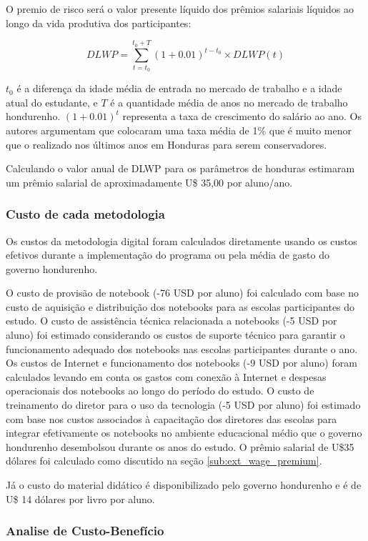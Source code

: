 \documentclass[12pt,letterpaper]{article}
\newcommand{\1}{\mathbbm{1}}
\numberwithin{equation}{section}
\begin{document}
O premio de risco será o valor presente líquido dos prêmios salariais líquidos ao longo da vida produtiva dos participantes:

\[DLWP = \sum_{t=t_0}^{t_0 + T} (1+0.01)^{t-t_0} \times DLWP(t)\]

\noindent \(t_0\) é a diferença da idade média de entrada no mercado de trabalho e a idade atual do estudante, e \(T\) é a quantidade média de anos no mercado de trabalho hondurenho. \((1+0.01)^t\) representa a taxa de crescimento do salário ao ano. Os autores argumentam que colocaram uma taxa média de 1\% que é muito menor que o realizado nos últimos anos em Honduras para serem conservadores.

Calculando o valor anual de DLWP para os parâmetros de honduras \cite{bando2016books} estimaram um prêmio salarial de aproximadamente U\$ 35,00 por aluno/ano. 

\subsubsection{Custo de cada metodologia} \label{sub:custo}

Os custos da metodologia digital foram calculados diretamente usando os custos efetivos durante a implementação do programa ou pela média de gasto do governo hondurenho.

O custo de provisão de notebook (-76 USD por aluno) foi calculado com base no custo de aquisição e distribuição dos notebooks para as escolas participantes do estudo. O custo de assistência técnica relacionada a notebooks (-5 USD por aluno) foi estimado considerando os custos de suporte técnico para garantir o funcionamento adequado dos notebooks nas escolas participantes durante o ano. Os custos de Internet e funcionamento dos notebooks (-9 USD por aluno) foram calculados levando em conta os gastos com conexão à Internet e despesas operacionais dos notebooks ao longo do período do estudo. O custo de treinamento do diretor para o uso da tecnologia (-5 USD por aluno) foi estimado com base nos custos associados à capacitação dos diretores das escolas para integrar efetivamente os notebooks no ambiente educacional médio que o governo hondurenho desembolsou durante os anos do estudo. O prêmio salarial de U\$35 dólares foi calculado como discutido na seção \ref{sub:ext_wage_premium}.

Já o custo do material didático é disponibilizado pelo governo hondurenho e é de U\$ 14 dólares por livro por aluno.

\subsubsection{Analise de Custo-Benefício}
\end{document}
